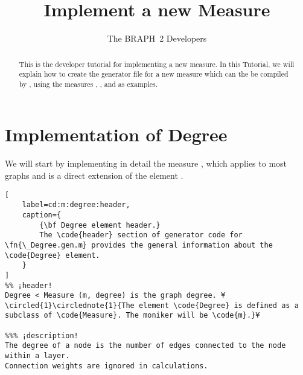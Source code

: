 \documentclass{tufte-handout}
\title{Implement a new Measure}
\author[The BRAPH~2 Developers]{The BRAPH~2 Developers}
\begin{document}
\maketitle

\begin{abstract}
\noindent
This is the developer tutorial for implementing a new measure. 
In this Tutorial, we will explain how to create the generator file  for a new measure which can the be compiled by , using the measures , , and  as examples.
\end{abstract}

\section{Implementation of Degree}

We will start by implementing in detail the measure , which applies to most graphs and is a direct extension of the element .

\begin{lstlisting}[
	label=cd:m:degree:header,
	caption={
		{\bf Degree element header.}
		The \code{header} section of generator code for \fn{\_Degree.gen.m} provides the general information about the \code{Degree} element.
	}
]
%% ¡header!
Degree < Measure (m, degree) is the graph degree. ¥\circled{1}\circlednote{1}{The element \code{Degree} is defined as a subclass of \code{Measure}. The moniker will be \code{m}.}¥

%%% ¡description!
The degree of a node is the number of edges connected to the node within a layer. 
Connection weights are ignored in calculations.
\end{lstlisting}
\end{document}
